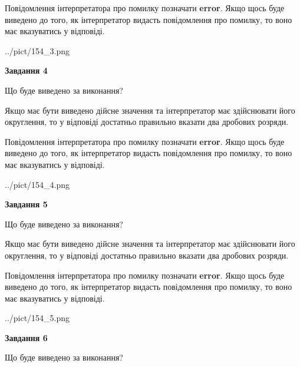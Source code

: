 \documentclass[12pt, ukrainian]{article}
\begin{document}
{\begin {Large}
Повідомлення інтерпретатора про помилку позначати \textbf{error}.
Якщо щось буде виведено до того, як інтерпретатор видасть повідомлення про помилку, 
то воно має вказуватись у відповіді. \par

\begin{center}
	{../pict/154_3.png}
\end{center}
\newpage

{\begin {center}\textbf{Завдання 4}\end {center}}\par
Що буде виведено за виконання? \par

Якщо має бути виведено дійсне значення та інтерпретатор має здійснювати його округлення, 
то у відповіді достатньо правильно вказати два дробових розряди.

Повідомлення інтерпретатора про помилку позначати \textbf{error}.
Якщо щось буде виведено до того, як інтерпретатор видасть повідомлення про помилку, 
то воно має вказуватись у відповіді. \par

\begin{center}
	{../pict/154_4.png}
\end{center}
\newpage

{\begin {center}\textbf{Завдання 5}\end {center}}\par
Що буде виведено за виконання? \par

Якщо має бути виведено дійсне значення та інтерпретатор має здійснювати його округлення, 
то у відповіді достатньо правильно вказати два дробових розряди.

Повідомлення інтерпретатора про помилку позначати \textbf{error}.
Якщо щось буде виведено до того, як інтерпретатор видасть повідомлення про помилку, 
то воно має вказуватись у відповіді. \par

\begin{center}
	{../pict/154_5.png}
\end{center}
\newpage

{\begin {center}\textbf{Завдання 6}\end {center}}\par
Що буде виведено за виконання? \par


\end{Large}}
\end{document}
